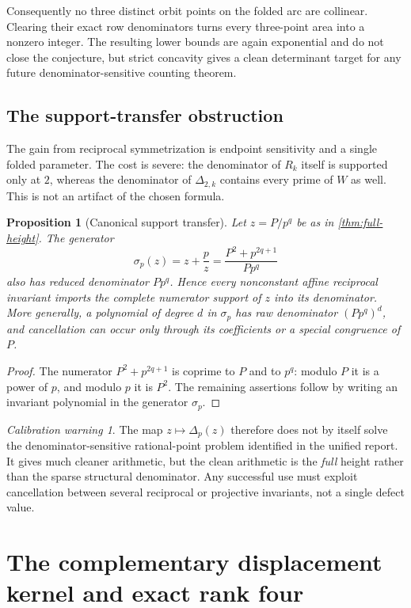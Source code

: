 \documentclass[11pt]{article}
\newtheorem{proposition}[theorem]{Proposition}
\theoremstyle{definition}
\theoremstyle{remark}
\newtheorem{warning}[theorem]{Calibration warning}
\begin{document}
Consequently no three distinct orbit points on the folded arc are collinear.  Clearing their exact row denominators turns every three-point area into a nonzero integer.  The resulting lower bounds are again exponential and do not close the conjecture, but strict concavity gives a clean determinant target for any future denominator-sensitive counting theorem.

\subsection{The support-transfer obstruction}

The gain from reciprocal symmetrization is endpoint sensitivity and a single folded parameter.  The cost is severe: the denominator of $R_k$ itself is supported only at $2$, whereas the denominator of $\Delta_{2,k}$ contains every prime of $W$ as well.  This is not an artifact of the chosen formula.

\begin{proposition}[Canonical support transfer]\label{prop:support-transfer}
Let $z=P/p^q$ be as in \cref{thm:full-height}.  The generator
\[
 \sigma_p(z)=z+\frac pz=\frac{P^2+p^{2q+1}}{Pp^q}
\]
also has reduced denominator $Pp^q$.  Hence every nonconstant affine reciprocal invariant imports the complete numerator support of $z$ into its denominator.  More generally, a polynomial of degree $d$ in $\sigma_p$ has raw denominator $(Pp^q)^d$, and cancellation can occur only through its coefficients or a special congruence of $P$.
\end{proposition}

\begin{proof}
The numerator $P^2+p^{2q+1}$ is coprime to $P$ and to $p^q$: modulo $P$ it is a power of $p$, and modulo $p$ it is $P^2$.  The remaining assertions follow by writing an invariant polynomial in the generator $\sigma_p$.
\end{proof}

\begin{warning}
The map $z\mapsto\Delta_p(z)$ therefore does not by itself solve the denominator-sensitive rational-point problem identified in the unified report.  It gives much cleaner arithmetic, but the clean arithmetic is the \emph{full} height rather than the sparse structural denominator.  Any successful use must exploit cancellation between several reciprocal or projective invariants, not a single defect value.
\end{warning}

\section{The complementary displacement kernel and exact rank four}
\label{sec:complementary-rank}
\end{document}
